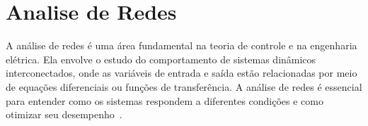 
\chapter{Analise de Redes}
\label{chap: analise de Redes}

A análise de redes é uma área fundamental na teoria de controle e na engenharia elétrica. Ela envolve o estudo do comportamento de sistemas dinâmicos interconectados, onde as variáveis de entrada e saída estão relacionadas por meio de equações diferenciais ou funções de transferência. A análise de redes é essencial para entender como os sistemas respondem a diferentes condições e como otimizar seu desempenho~\cite{veettil2022coastal}.

